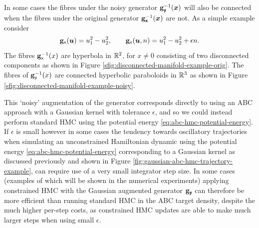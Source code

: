 In some cases the fibres under the noisy generator ${\mathbf{g}}_{\boldsymbol{\mathsf{y}}}^{-1}(\boldsymbol{x})$ will also be connected when the fibres under the original generator ${\mathbf{g}}_{\boldsymbol{\mathsf{x}}}^{-1}(\boldsymbol{x})$ are not. As a simple example consider
\begin{equation}\label{eq:disconnected-manifold-example}
  {\mathbf{g}}_{\mathsf{x}}(\boldsymbol{u}) = u_1^2 - u_2^2,
  \qquad
  {\mathbf{g}}_{\mathsf{x}}(\boldsymbol{u}, n) = u_1^2 - u_2^2 + \epsilon n.
\end{equation}
The fibres ${\mathbf{g}}_{\mathsf{x}}^{-1}(x)$ are hyperbola in $\mathbb{R}^2$, for $x \neq 0$ consisting of two disconnected components as shown in Figure \ref{sfig:disconnected-manifold-example-orig}. The fibres of ${\mathbf{g}}_{\mathsf{y}}^{-1}(x)$ are connected hyperbolic paraboloids in $\mathbb{R}^3$ as shown in Figure \ref{sfig:disconnected-manifold-example-noisy}.

This `noisy' augmentation of the generator corresponds directly to using an \ac{ABC} approach with a Gaussian kernel with tolerance $\epsilon$, and so we could instead perform standard \ac{HMC} using the potential energy \eqref{eq:abc-hmc-potential-energy}. If $\epsilon$ is small however in some cases the tendency towards oscillatory trajectories when simulating an unconstrained Hamiltonian dynamic using the potential energy \eqref{eq:abc-hmc-potential-energy} corresponding to a Gaussian kernel as discussed previously and shown in Figure \ref{fig:gaussian-abc-hmc-trajectory-example}, can require use of a very small integrator step size. In some cases (examples of which will be shown in the numerical experiments) applying constrained \ac{HMC} with the Gaussian augmented generator ${\mathbf{g}}_{\boldsymbol{\mathsf{y}}}$ can therefore be more efficient than running standard \ac{HMC} in the \ac{ABC} target density, despite the much higher per-step costs, as constrained \ac{HMC} updates are able to make much larger steps when using small $\epsilon$. 

